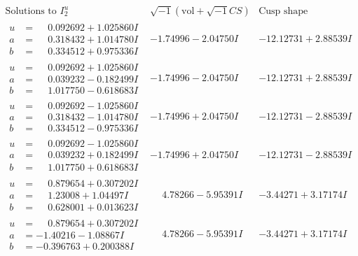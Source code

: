 \documentclass[1p]{elsarticle_modified}
\theoremstyle{definition}
\newcommand{\I}{\sqrt{-1}}
\begin{document}
$$\begin{array}{c|c|c}  
\text{Solutions to }I^u_{2}& \I (\text{vol} + \sqrt{-1}CS) & \text{Cusp shape}\\
 \hline 
\begin{aligned}
u &= \phantom{-}0.092692 + 1.025860 I \\
a &= \phantom{-}0.318432 + 1.014780 I \\
b &= \phantom{-}0.334512 + 0.975336 I\end{aligned}
 & -1.74996 - 2.04750 I & -12.12731 + 2.88539 I \\ \hline\begin{aligned}
u &= \phantom{-}0.092692 + 1.025860 I \\
a &= \phantom{-}0.039232 - 0.182499 I \\
b &= \phantom{-}1.017750 - 0.618683 I\end{aligned}
 & -1.74996 - 2.04750 I & -12.12731 + 2.88539 I \\ \hline\begin{aligned}
u &= \phantom{-}0.092692 - 1.025860 I \\
a &= \phantom{-}0.318432 - 1.014780 I \\
b &= \phantom{-}0.334512 - 0.975336 I\end{aligned}
 & -1.74996 + 2.04750 I & -12.12731 - 2.88539 I \\ \hline\begin{aligned}
u &= \phantom{-}0.092692 - 1.025860 I \\
a &= \phantom{-}0.039232 + 0.182499 I \\
b &= \phantom{-}1.017750 + 0.618683 I\end{aligned}
 & -1.74996 + 2.04750 I & -12.12731 - 2.88539 I \\ \hline\begin{aligned}
u &= \phantom{-}0.879654 + 0.307202 I \\
a &= \phantom{-}1.23008 + 1.04497 I \\
b &= \phantom{-}0.628001 + 0.013623 I\end{aligned}
 & \phantom{-}4.78266 - 5.95391 I & -3.44271 + 3.17174 I \\ \hline\begin{aligned}
u &= \phantom{-}0.879654 + 0.307202 I \\
a &= -1.40216 - 1.08867 I \\
b &= -0.396763 + 0.200388 I\end{aligned}
 & \phantom{-}4.78266 - 5.95391 I & -3.44271 + 3.17174 I \\ \hline\begin{aligned}

\end{aligned}
\end{array}$$
\end{document}
